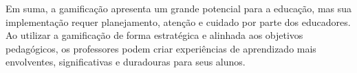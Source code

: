 Em suma, a gamificação apresenta um grande potencial para a educação, mas sua implementação requer planejamento, atenção e cuidado por parte dos educadores. Ao utilizar a gamificação de forma estratégica e alinhada aos objetivos pedagógicos, os professores podem criar experiências de aprendizado mais envolventes, significativas e duradouras para seus alunos.







